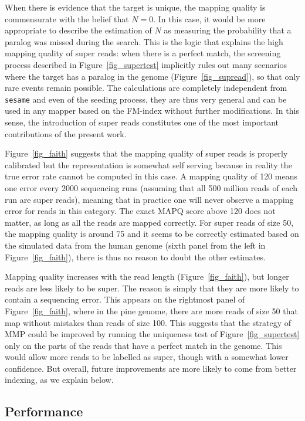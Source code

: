 \documentclass[a4,center,fleqn]{NAR}
\begin{document}
When there is evidence that the target is unique, the mapping quality is
commensurate with the belief that $N = 0$. In this case, it would be more
appropriate to describe the estimation of $N$ as measuring the probability
that a paralog was missed during the search. This is the logic that
explains the high mapping quality of super reads: when there is a perfect
match, the screening process described in Figure~\ref{fig_supertest}
implicitly rules out many scenarios where the target has a paralog in the
genome (Figure~\ref{fig_supread}), so that only rare events remain
possible. The calculations are completely independent from \texttt{sesame}
and even of the seeding process, they are thus very general and can be
used in any mapper based on the FM-index without further modifications. In
this sense, the introduction of super reads constitutes one of the most
important contributions of the present work.

Figure~\ref{fig_faith} suggests that the mapping quality of super reads is
properly calibrated but the representation is somewhat self serving
because in reality the true error rate cannot be computed in this case. A
mapping quality of 120 means one error every 2000 sequencing runs
(assuming that all 500 million reads of each run are super reads), meaning
that in practice one will never observe a mapping error for reads in this
category. The exact MAPQ score above 120 does not matter, as long as all
the reads are mapped correctly. For super reads of size 50, the mapping
quality is around 75 and it seems to be correctly estimated based on the
simulated data from the human genome (sixth panel from the left in
Figure~\ref{fig_faith}), there is thus no reason to doubt the other
estimates.

Mapping quality increases with the read length (Figure~\ref{fig_faith}),
but longer reads are less likely to be super. The reason is simply that
they are more likely to contain a sequencing error. This appears on the
rightmost panel of Figure~\ref{fig_faith}, where in the pine genome, there
are more reads of size 50 that map without mistakes than reads of size
100. This suggests that the strategy of MMP could be improved by running
the uniqueness test of Figure~\ref{fig_supertest} only on the parts of the
reads that have a perfect match in the genome. This would allow more reads
to be labelled as super, though with a somewhat lower confidence. But
overall, future improvements are more likely to come from better indexing,
as we explain below.


\subsection{Performance}
\end{document}
